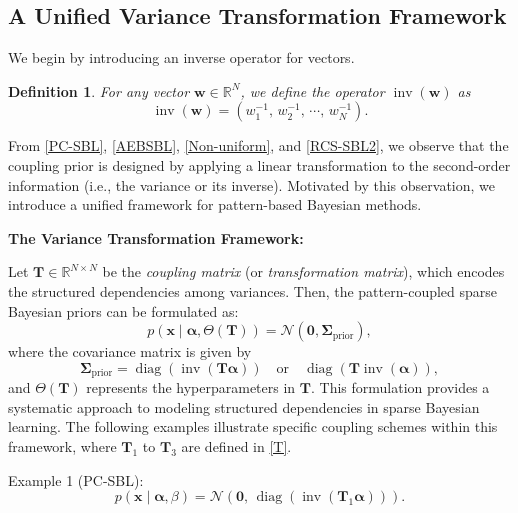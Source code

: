 \documentclass[lettersize,journal]{IEEEtran}
\DeclareMathOperator{\inv}{inv}
\DeclareMathOperator{\diag}{diag}
\newtheorem{definition}{Definition}
\theoremstyle{remark}
\begin{document}
\subsection{A Unified Variance Transformation Framework}



We begin by introducing an  inverse operator for vectors.
\begin{definition}
	For any vector \( \mathbf{w}\in\mathbb{R}^N \), we define the operator \(\inv(\mathbf{w})\) as
	\begin{equation}
		\inv(\mathbf{w}) = \left(w_1^{-1},\,w_2^{-1},\,\cdots,\,w_N^{-1}\right).
	\end{equation}
\end{definition}


From \eqref{PC-SBL}, \eqref{AEBSBL}, \eqref{Non-uniform}, and \eqref{RCS-SBL2}, we observe that the coupling prior is designed by applying a linear transformation to the second-order information (i.e., the variance or its inverse). Motivated by this observation, we introduce a unified framework for pattern-based Bayesian methods.



\textbf{The Variance Transformation Framework:}

Let \( \boldsymbol{T} \in \mathbb{R}^{N \times N} \) be the \emph{coupling matrix} (or \emph{transformation matrix}), which encodes the structured dependencies among variances. Then, the pattern-coupled sparse Bayesian priors can be formulated as:  
\begin{equation}
	p(\mathbf{x}\mid  \boldsymbol{\alpha}, \Theta(\boldsymbol{T}))=\mathcal{N}\left(\mathbf{0}, 	\boldsymbol{\Sigma}_{\text{prior}} \right),\label{vt1}
\end{equation}
where the covariance matrix is given by
\begin{equation}
	\boldsymbol{\Sigma}_{\text{prior}} = \diag\left(\inv\left(\boldsymbol{T}\boldsymbol{\alpha}\right)\right)
	\quad \text{or} \quad
	\diag\left(\boldsymbol{T}\inv\left(\boldsymbol{\alpha}\right)\right),\label{vt2}
\end{equation}
and $\Theta(\boldsymbol{T})$ represents the hyperparameters in $\boldsymbol{T}$. This formulation provides a systematic approach to modeling structured dependencies in sparse Bayesian learning.
The following examples illustrate specific coupling schemes within this framework, where $\boldsymbol{T}_1$ to $\boldsymbol{T}_3$
are defined in \eqref{T}.

\noindent Example 1 (PC-SBL):
\begin{equation}
	p(\mathbf{x} \mid \boldsymbol{\alpha}, \beta) = \mathcal{N}\left(\mathbf{0},\,\diag\left(\inv\left(\boldsymbol{T}_1\boldsymbol{\alpha}\right)\right)\right).
\end{equation}
\end{document}
